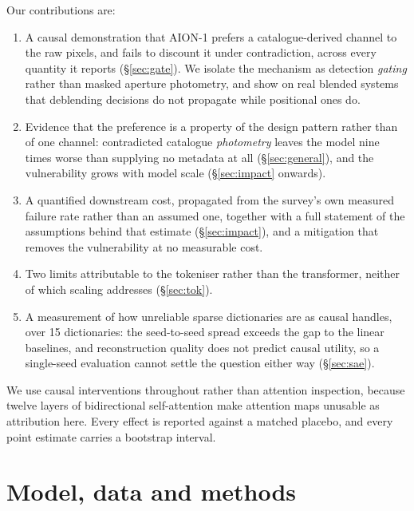 \documentclass[11pt]{article}
\newcommand{\aion}{AION-1}
\begin{document}
Our contributions are:
\begin{enumerate}\itemsep2pt
\item A causal demonstration that \aion{} prefers a catalogue-derived channel to the raw pixels,
and fails to discount it under contradiction, across every quantity it reports
(\S\ref{sec:gate}). We isolate the mechanism as detection \emph{gating} rather than masked
aperture photometry, and show on real blended systems that deblending decisions do not propagate
while positional ones do.
\item Evidence that the preference is a property of the design pattern rather than of one
channel: contradicted catalogue \emph{photometry} leaves the model nine times worse than
supplying no metadata at all (\S\ref{sec:general}), and the vulnerability grows with model
scale (\S\ref{sec:impact} onwards).
\item A quantified downstream cost, propagated from the survey's own measured failure rate
rather than an assumed one, together with a full statement of the assumptions behind that
estimate (\S\ref{sec:impact}), and a mitigation that removes the vulnerability at no measurable
cost.
\item Two limits attributable to the tokeniser rather than the transformer, neither of which
scaling addresses (\S\ref{sec:tok}).
\item A measurement of how unreliable sparse dictionaries are as causal handles, over 15
dictionaries: the seed-to-seed spread exceeds the gap to the linear baselines, and
reconstruction quality does not predict causal utility, so a single-seed evaluation cannot
settle the question either way (\S\ref{sec:sae}).
\end{enumerate}

We use causal interventions throughout rather than attention inspection, because twelve layers
of bidirectional self-attention make attention maps unusable as attribution here. Every effect
is reported against a matched placebo, and every point estimate carries a bootstrap interval.

\section{Model, data and methods}
\label{sec:methods}
\end{document}
